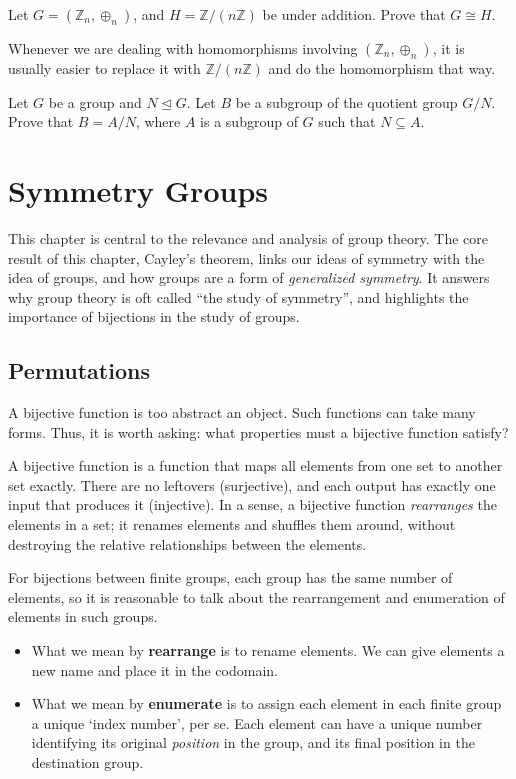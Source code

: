 \begin{problem}\label{problem-Zn-isomorphic-to-Z-by-nZ}
    Let $G = (\mathbb{Z}_n, \oplus_n)$, and $H = \mathbb{Z}/(n\mathbb{Z})$ be under addition. Prove that $G \cong H$.
\end{problem}
\begin{remark}
    Whenever we are dealing with homomorphisms involving $(\mathbb{Z}_n, \oplus_n)$, it is usually easier to replace it with $\mathbb{Z}/(n\mathbb{Z})$ and do the homomorphism that way.
\end{remark}

\begin{problem}\label{problem-subgroup-of-quotient-group-is-quotient-group}
    Let $G$ be a group and $N \unlhd G$. Let $B$ be a subgroup of the quotient group $G/N$. Prove that $B = A/N$, where $A$ is a subgroup of $G$ such that $N \subseteq A$.
\end{problem}

\chapter{Symmetry Groups}
This chapter is central to the relevance and analysis of group theory. The core result of this chapter, Cayley's theorem, links our ideas of symmetry with the idea of groups, and how groups are a form of \textit{generalized symmetry}. It answers why group theory is oft called ``the study of symmetry'', and highlights the importance of bijections in the study of groups.

\section{Permutations}
A bijective function is too abstract an object. Such functions can take many forms. Thus, it is worth asking: what properties must a bijective function satisfy?

A bijective function is a function that maps all elements from one set to another set exactly. There are no leftovers (surjective), and each output has exactly one input that produces it (injective). In a sense, a bijective function \textit{rearranges} the elements in a set; it renames elements and shuffles them around, without destroying the relative relationships between the elements.

For bijections between finite groups, each group has the same number of elements, so it is reasonable to talk about the rearrangement and enumeration of elements in such groups.
\begin{itemize}
    \item What we mean by \textbf{rearrange} is to rename elements. We can give elements a new name and place it in the codomain.
    \item What we mean by \textbf{enumerate} is to assign each element in each finite group a unique `index number', per se. Each element can have a unique number identifying its original \textit{position} in the group, and its final position in the destination group.
\end{itemize}


